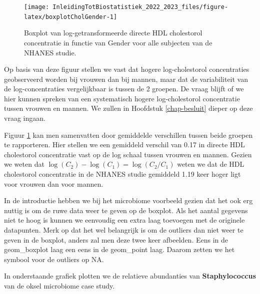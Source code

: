 \documentclass[
  12pt,dutch,coursenotes]{book}
\begin{document}
\begin{figure}

{\centering \texttt{[image: InleidingTotBiostatistiek\_2022\_2023\_files/figure-latex/boxplotCholGender-1]} 

}

\caption{Boxplot van log-getransformeerde directe HDL cholestorol concentratie in functie van Gender voor alle subjecten van de NHANES studie.}\label{fig:boxplotCholGender}
\end{figure}

Op basis van deze figuur
stellen we vast dat hogere log-cholestorol concentraties
geobserveerd worden bij vrouwen dan bij mannen, maar dat de variabiliteit
van de log-concentraties vergelijkbaar is tussen de 2 groepen. De vraag blijft of we hier kunnen spreken van een systematisch hogere
log-cholestorol concentratie tussen vrouwen en mannen. We zullen in Hoofdstuk \ref{chap-besluit} dieper op deze vraag ingaan.

Figuur \ref{fig:boxplotCholGender} kan men samenvatten door gemiddelde verschillen tussen beide groepen te rapporteren. Hier stellen we een gemiddeld verschil van 0.17 in directe HDL cholestorol concentratie vast op de log schaal tussen vrouwen en mannen.
Gezien we weten dat \(\log(C_2)-\log(C_1)=\log(C_2/C_1)\) weten we dat de HDL cholestorol concentratie in de NHANES studie gemiddeld 1.19 keer hoger ligt voor vrouwen dan voor mannen.

In de introductie hebben we bij het microbiome voorbeeld gezien dat het ook erg nuttig is om de ruwe data weer te geven op de boxplot. Als het aantal gegevens niet te hoog is kunnen we eenvoudig een extra laag toevoegen met de originele datapunten. Merk op dat het wel belangrijk is om de outliers dan niet weer te geven in de boxplot, anders zal men deze twee keer afbeelden. Eens in de geom\_boxplot laag een eens in de geom\_point laag. Daarom zetten we het symbool voor de outliers op NA.

In onderstaande grafiek plotten we de relatieve abundanties van \textbf{Staphylococcus} van de oksel microbiome case study.
\end{document}
